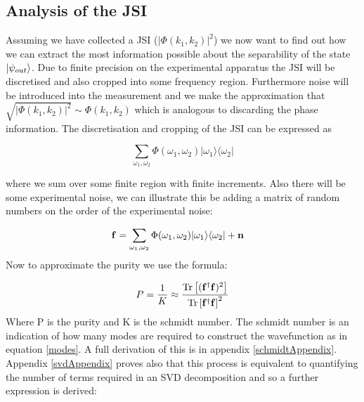 
\subsection{Analysis of the JSI}

Assuming we have collected a JSI ($|\Phi(k_1,k_2)|^2$) we now want to find out how we can extract the most information possible about the separability of the state $\ket{\psi_{out}}$. Due to finite precision on the experimental apparatus the JSI will be discretised and also cropped into some frequency region. Furthermore noise will be introduced into the measurement and we make the approximation that $\sqrt{|\Phi(k_1,k_2)|^2}\sim \Phi(k_1,k_2)$ which is analogous to discarding the phase information. The discretisation and cropping of the JSI can be expressed as

\begin{equation}
\sum_{\omega_1,\omega_2}\Phi(\omega_1,\omega_2)|\omega_1\rangle\langle\omega_2|
\end{equation}

where we sum over some finite region with finite increments. Also there will be some experimental noise, we can illustrate this be adding a matrix of random numbers on the order of the experimental noise:

\begin{align}
{\bf f}&=\sum_{\omega_1,\omega_2}\Phi(\omega_1,\omega_2)|\omega_1\rangle\langle\omega_2| + {\bf n }
\end{align}
\noindent
Now to approximate the purity we use the formula:

\begin{equation} \label{purityEqn2}
P = \frac{1}{K}\approx\frac{\operatorname{Tr}\left [({\bf f}^{\dagger}{\bf f})^2 \right ]}{\operatorname{Tr}\left [{\bf f}^{\dagger}{\bf f} \right ]^2}
\end{equation}
\noindent
Where P is the purity and K is the schmidt number. The schmidt number is an indication of how many modes are required to construct the wavefunction as in equation \ref{modes}. A full derivation of this is in appendix \ref{schmidtAppendix}. Appendix \ref{svdAppendix} proves also that this process is equivalent to quantifying the number of terms required in an SVD decomposition and so a further expression is derived:

